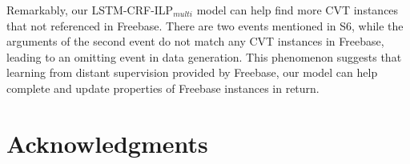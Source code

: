 \documentclass{article}
\begin{document}
Remarkably, our LSTM-CRF-ILP$_{multi}$ model can help find more CVT instances that not referenced in Freebase. There are two events mentioned in S6, while the arguments of the second event do not match any CVT instances in Freebase, leading to an omitting event in data generation. This phenomenon suggests that learning from distant supervision provided by Freebase, our model can help complete and update properties of Freebase instances in return.

\section*{Acknowledgments}



\end{document}
